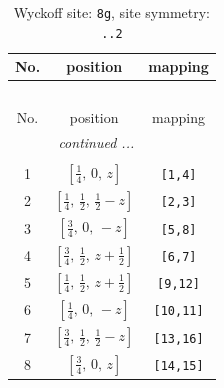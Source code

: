 \documentclass[fleqn,8pt]{jsarticle}
\begin{document}
\renewcommand{\arraystretch}{1.2}
\begin{longtable}{ccc}
\caption{Wyckoff site: {\tt 8g}, site symmetry: {\tt ..2}}
 \\
 \hline \hline
No. & position & mapping \\ \hline \endfirsthead

\multicolumn{2}{l}{\tablename\ \thetable{}} \\
 \hline \hline
No. & position & mapping \\ \hline \endhead

 \hline \hline
\multicolumn{2}{r}{\footnotesize\it continued ...} \\ \endfoot

 \hline \hline
\multicolumn{2}{r}{} \\ \endlastfoot

1 & $\left[ \frac{1}{4},\, 0,\, z \right]$ & {\tt [1,4]} \\ \hline
2 & $\left[ \frac{1}{4},\, \frac{1}{2},\, \frac{1}{2} - z \right]$ & {\tt [2,3]} \\ \hline
3 & $\left[ \frac{3}{4},\, 0,\, - z \right]$ & {\tt [5,8]} \\ \hline
4 & $\left[ \frac{3}{4},\, \frac{1}{2},\, z + \frac{1}{2} \right]$ & {\tt [6,7]} \\ \hline
5 & $\left[ \frac{1}{4},\, \frac{1}{2},\, z + \frac{1}{2} \right]$ & {\tt [9,12]} \\ \hline
6 & $\left[ \frac{1}{4},\, 0,\, - z \right]$ & {\tt [10,11]} \\ \hline
7 & $\left[ \frac{3}{4},\, \frac{1}{2},\, \frac{1}{2} - z \right]$ & {\tt [13,16]} \\ \hline
8 & $\left[ \frac{3}{4},\, 0,\, z \right]$ & {\tt [14,15]} \\
\end{longtable}
\renewcommand{\arraystretch}{1.2}
\end{document}
